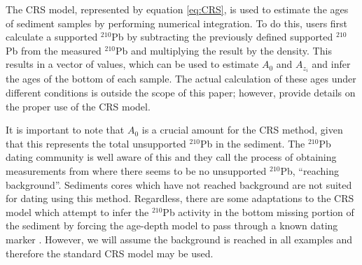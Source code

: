 \documentclass [10pt] {article}
\newcommand{\ac}{\color{red} }  %
\newcommand{\ca}{\color{black}} %
\begin{document}
The CRS model, represented by equation \ref{eq:CRS}, is used to estimate the ages of sediment samples by performing numerical integration. To do this, users first calculate a supported $^{210}$Pb by subtracting the previously defined supported $^{210}$Pb from the measured $^{210}$Pb and multiplying the result by the density. This results in a vector of values, which can be used to estimate $A_0$ and $A_{z_i}$ and infer the ages of the bottom of each sample. The actual calculation of these ages under different conditions is outside the scope of this paper; however, \citet{Sanchez-Cabeza2012} provide details on the proper use of the CRS model.


It is important to note that $A_0$ is a crucial amount  for the CRS method, given that this represents the total unsupported $^{210}$Pb in the sediment. The $^{210}$Pb dating community is well aware of this and they call the process of obtaining measurements from where there seems to be no unsupported $^{210}$Pb, ``reaching background''. Sediments cores which have not reached background are not suited for dating using this method. Regardless, there are some adaptations to the CRS model which attempt to infer the $^{210}$Pb activity in the bottom missing portion of the sediment by forcing the age-depth model to pass through a known dating marker \citep[a depth which age is known from other methods][]{Sanchez-Cabeza2012}. However, we will assume the background is reached in all examples and therefore the standard CRS model may be used.



\end{document}

